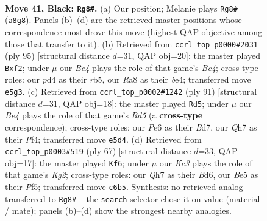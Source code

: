 \documentclass[11pt]{article}
\begin{document}
\clearpage

\begin{figure}[p]\centering
\begin{subfigure}{0.46\textwidth}\centering
\resizebox{\linewidth}{!}{%
\newchessgame
\chessboard[
  setfen={r7/p6q/2k1p3/p2pb1K1/3P2P1/8/8/8 b - - 0 41},
  showmover=false,
  pgfstyle=straightmove, color=movearrow, markmove={a8-g8}
]}
\caption{}
\end{subfigure}\hfill
\begin{subfigure}{0.46\textwidth}\centering
\resizebox{\linewidth}{!}{%
\newchessgame
\chessboard[
  setfen={8/2r2p2/5k2/1Rb4p/4BK2/p6P/P4P2/8 b - - 0 48},
  showmover=false,
  pgfstyle=straightmove, color=movearrow, markmove={c5-f2}
]}
\caption{}
\end{subfigure}
\\[4pt]
\begin{subfigure}{0.46\textwidth}\centering
\resizebox{\linewidth}{!}{%
\newchessgame
\chessboard[
  setfen={8/R2b2pk/6p1/8/3r1p1P/5P2/1B4PK/8 b - - 14 46},
  showmover=false,
  pgfstyle=straightmove, color=movearrow, markmove={d4-d5}
]}
\caption{}
\end{subfigure}\hfill
\begin{subfigure}{0.46\textwidth}\centering
\resizebox{\linewidth}{!}{%
\newchessgame
\chessboard[
  setfen={8/6k1/3b2pp/5p2/6P1/1B3K2/5P1P/8 b - - 0 34},
  showmover=false,
  pgfstyle=straightmove, color=movearrow, markmove={g7-f6}
]}
\caption{}
\end{subfigure}
\caption{\textbf{Move 41, Black: \texttt{Rg8\#}.} (a) Our position; Melanie plays \texttt{Rg8\#} (\texttt{a8g8}). Panels (b)--(d) are the retrieved master positions whose correspondence most drove this move (highest QAP objective among those that transfer to it). (b) Retrieved from \texttt{ccrl\_top\_p0000\#2031} (ply 95) [structural distance $d$=31, QAP obj=20]: the master played \texttt{Bxf2}; under $\mu$ our \emph{Be4} plays the role of that game's \emph{Bc4}; cross-type roles: our \emph{p}d4 as their \emph{r}b5, our \emph{R}a8 as their \emph{b}e4; transferred move \texttt{e5g3}. (c) Retrieved from \texttt{ccrl\_top\_p0002\#1242} (ply 91) [structural distance $d$=31, QAP obj=18]: the master played \texttt{Rd5}; under $\mu$ our \emph{Be4} plays the role of that game's \emph{Rd5} (a \textbf{cross-type} correspondence); cross-type roles: our \emph{P}e6 as their \emph{B}d7, our \emph{Q}h7 as their \emph{P}f4; transferred move \texttt{e5d4}. (d) Retrieved from \texttt{ccrl\_top\_p0003\#519} (ply 67) [structural distance $d$=33, QAP obj=17]: the master played \texttt{Kf6}; under $\mu$ our \emph{Kc3} plays the role of that game's \emph{Kg2}; cross-type roles: our \emph{Q}h7 as their \emph{B}d6, our \emph{B}e5 as their \emph{P}f5; transferred move \texttt{c6b5}. Synthesis: no retrieved analog transferred to \texttt{Rg8\#} -- the \texttt{search} selector chose it on value (material / mate); panels (b)--(d) show the strongest nearby analogies.}
\label{fig:thought-m81}
\end{figure}
\end{document}
